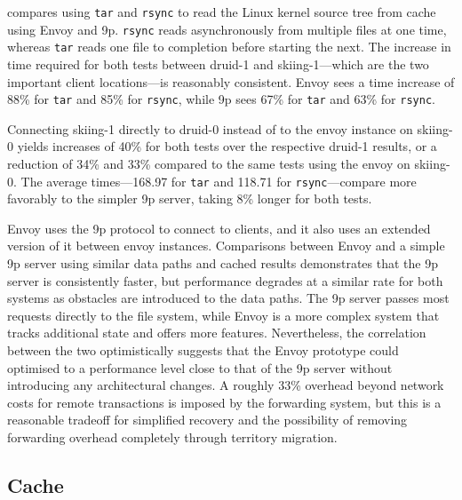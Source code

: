  compares using \texttt{tar} and \texttt{rsync} to read the Linux kernel source tree from cache using Envoy and 9p. \texttt{rsync} reads asynchronously from multiple files at one time, whereas \texttt{tar} reads one file to completion before starting the next. The increase in time required for both tests between druid-1 and skiing-1---which are the two important client locations---is reasonably consistent. Envoy sees a time increase of 88\% for \texttt{tar} and 85\% for \texttt{rsync}, while 9p sees 67\% for \texttt{tar} and 63\% for \texttt{rsync}.

Connecting skiing-1 directly to druid-0 instead of to the envoy instance on skiing-0 yields increases of 40\% for both tests over the respective druid-1 results, or a reduction of 34\% and 33\% compared to the same tests using the envoy on skiing-0. The average times---168.97 for \texttt{tar} and 118.71 for \texttt{rsync}---compare more favorably to the simpler 9p server, taking 8\% longer for both tests.

Envoy uses the 9p protocol to connect to clients, and it also uses an extended version of it between envoy instances. Comparisons between Envoy and a simple 9p server using similar data paths and cached results demonstrates that the 9p server is consistently faster, but performance degrades at a similar rate for both systems as obstacles are introduced to the data paths. The 9p server passes most requests directly to the file system, while Envoy is a more complex system that tracks additional state and offers more features. Nevertheless, the correlation between the two optimistically suggests that the Envoy prototype could optimised to a performance level close to that of the 9p server without introducing any architectural changes. A roughly 33\% overhead beyond network costs for remote transactions is imposed by the forwarding system, but this is a reasonable tradeoff for simplified recovery and the possibility of removing forwarding overhead completely through territory migration.

\subsection{Cache}

